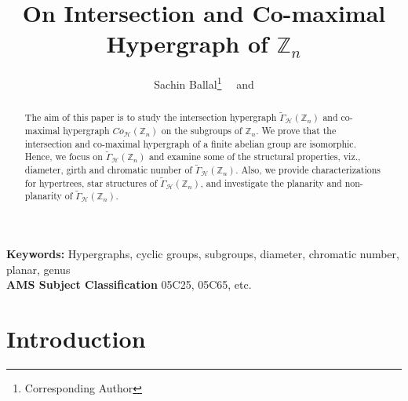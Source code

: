 \documentclass[11pt,a4paper]{article}
\date{}
\theoremstyle{definition}
\theoremstyle{remark}
\begin{document}
		\title{\sc On Intersection and Co-maximal Hypergraph of $\mathbb{Z}_n$}
		
		\author{{ \sc Sachin Ballal}\footnote{Corresponding Author}~~  and  }
	
	
	
	\date{}
	\maketitle
	
	\begin{abstract}
 The aim of this paper is to study the intersection hypergraph  $\tilde{\Gamma}_\mathcal{H}(\mathbb{Z}_n)$ and co-maximal hypergraph $Co_\mathcal{H}(\mathbb{Z}_n)$ on the subgroups of $\mathbb{Z}_n$. We prove that  the intersection and co-maximal hypergraph of  a finite abelian group are isomorphic. Hence,  we focus on $\tilde{\Gamma}_\mathcal{H}(\mathbb{Z}_n)$ and examine some of the structural properties, viz., diameter, girth and chromatic number of $\tilde{\Gamma}_\mathcal{H}(\mathbb{Z}_n)$. Also, we provide characterizations for  hypertrees, star structures of  $\tilde{\Gamma}_\mathcal{H}(\mathbb{Z}_n)$, and investigate the planarity and non-planarity of  $\tilde{\Gamma}_\mathcal{H}(\mathbb{Z}_n)$.
\end{abstract}
\noindent \small \textbf{Keywords:} Hypergraphs, cyclic groups, subgroups, diameter, chromatic number, planar, genus\\
\noindent \small \textbf{AMS Subject Classification} 05C25, 05C65, etc.
	
	\section{Introduction}
\end{document}
